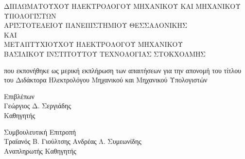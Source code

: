 \begin{center}
   \vspace{0.5cm}

   {\footnotesize ΔΙΠΛΩΜΑΤΟΥΧΟΥ ΗΛΕΚΤΡΟΛΟΓΟΥ ΜΗΧΑΝΙΚΟΥ ΚΑΙ ΜΗΧΑΝΙΚΟΥ ΥΠΟΛΟΓΙΣΤΩΝ\\}
   {\footnotesize ΑΡΙΣΤΟΤΕΛΕΙΟΥ ΠΑΝΕΠΙΣΤΗΜΙΟΥ ΘΕΣΣΑΛΟΝΙΚΗΣ\\}
   {\footnotesize ΚΑΙ\\}
   {\footnotesize ΜΕΤΑΠΤΥΧΙΟΥΧΟΥ ΗΛΕΚΤΡΟΛΟΓΟΥ ΜΗΧΑΝΙΚΟΥ\\}
   {\footnotesize ΒΑΣΙΛΙΚΟΥ ΙΝΣΤΙΤΟΥΤΟΥ ΤΕΧΝΟΛΟΓΙΑΣ ΣΤΟΚΧΟΛΜΗΣ\\}

   \vspace{1.0cm}

   {που εκπονήθηκε ως μερική εκπλήρωση των απαιτήσεων για την απονομή του
   τίτλου του Διδάκτορα Ηλεκτρολόγου Μηχανικού και Μηχανικού Υπολογιστών}

   \vspace{1.8cm}

   {Επιβλέπων\\}
   \vspace{-0.2cm}
   {Γεώργιος Δ. Σεργιάδης\\}
   \vspace{-0.2cm}
   {Καθηγητής}

   \vspace{0.7cm}

   {Συμβουλευτική Επιτροπή\\}
   {Τραϊανός Β. Γιούλτσης} \hspace{5cm} {Ανδρέας Λ. Συμεωνίδης\\}
   \vspace{-0.2cm}
   \hspace{1.2cm}{Καθηγητής}             \hspace{5.8cm} {Αναπληρωτής Καθηγητής}

\end{center}
